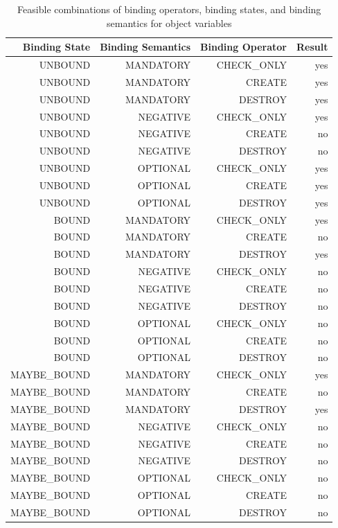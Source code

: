 \begin{table}[htbp]
  \centering
  \caption{Feasible combinations of binding operators, binding states, and
  binding semantics for object variables}
    \begin{tabular}{|r|r|r|r|}
    \hline
    \textbf{Binding State} & \textbf{Binding Semantics} & \textbf{Binding
    Operator} & \textbf{Result} \\
    \hline
    UNBOUND & MANDATORY & CHECK\_ONLY & yes \\
    UNBOUND & MANDATORY & CREATE & yes \\
    UNBOUND & MANDATORY & DESTROY & yes \\
    UNBOUND & NEGATIVE & CHECK\_ONLY & yes \\
    UNBOUND & NEGATIVE & CREATE & no \\
    UNBOUND & NEGATIVE & DESTROY & no \\
    UNBOUND & OPTIONAL & CHECK\_ONLY & yes \\
    UNBOUND & OPTIONAL & CREATE & yes \\
    UNBOUND & OPTIONAL & DESTROY & yes \\
    \hline
    BOUND & MANDATORY & CHECK\_ONLY & yes \\
    BOUND & MANDATORY & CREATE & no \\
    BOUND & MANDATORY & DESTROY & yes \\
    BOUND & NEGATIVE & CHECK\_ONLY & no \\
    BOUND & NEGATIVE & CREATE & no \\
    BOUND & NEGATIVE & DESTROY & no \\
    BOUND & OPTIONAL & CHECK\_ONLY & no \\
    BOUND & OPTIONAL & CREATE & no \\
    BOUND & OPTIONAL & DESTROY & no \\
    \hline
    MAYBE\_BOUND & MANDATORY & CHECK\_ONLY & yes \\
    MAYBE\_BOUND & MANDATORY & CREATE & no \\
    MAYBE\_BOUND & MANDATORY & DESTROY & yes \\
    MAYBE\_BOUND & NEGATIVE & CHECK\_ONLY & no \\
    MAYBE\_BOUND & NEGATIVE & CREATE & no \\
    MAYBE\_BOUND & NEGATIVE & DESTROY & no \\
    MAYBE\_BOUND & OPTIONAL & CHECK\_ONLY & no \\
    MAYBE\_BOUND & OPTIONAL & CREATE & no \\
    MAYBE\_BOUND & OPTIONAL & DESTROY & no \\
    \hline
    \end{tabular}%
  \label{tab:bindingCombinations}%
\end{table}%

